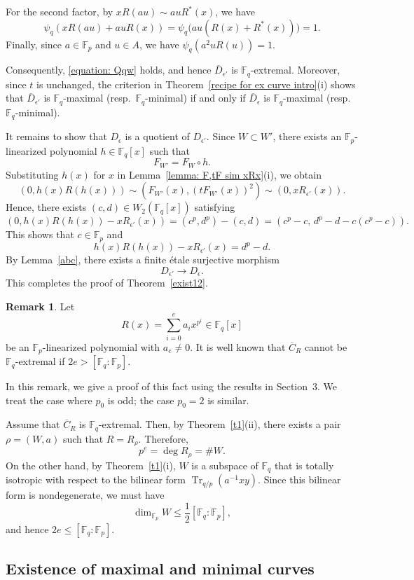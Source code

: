 \documentclass[12pt,a4paper]{amsart}
\theoremstyle{definition}
\newtheorem{remark}[theorem]{Remark}
\def\F{{\mathbb F}}
\theoremstyle{remark}
\DeclareMathOperator{\Tr}{Tr}
\begin{document}
For the second factor, by $x R(au) \sim au R^\ast(x)$,  we have
\[
\psi_q(xR(au)+auR(x))
=
\psi_q\bigl(au(R(x)+R^\ast(x))\bigr)
=
1.
\]
Finally, since $a \in \F_p$ and $u\in A$, we have $\psi_q(a^2uR(u))=1$. 


Consequently, \eqref{equation: Qqw} holds, and hence $\overline{D}_{\epsilon'}$ is $\F_q$-extremal. Moreover, since $t$ is unchanged, the criterion in
Theorem~\ref{recipe for ex curve intro}(i) shows that $\overline{D}_{\epsilon'}$ is $\F_q$-maximal
(resp.\ $\F_q$-minimal) if and only if $\overline{D}_{\epsilon}$ is
$\F_q$-maximal (resp.\ $\F_q$-minimal). 

\medskip


It remains to show that $D_{\epsilon}$ is a quotient of $D_{\epsilon'}$.  Since $W\subset W'$, there exists an $\F_p$-linearized polynomial $h\in\F_q[x]$ such that 
\[F_{W'}=F_W\circ h. \]
Substituting $h(x)$ for $x$ in Lemma~\ref{lemma: F,tF sim  xRx}(i), we obtain 
\[
(0,h(x)R(h(x)))\sim \left(F_{W'}(x),(tF_{W'}(x))^2\right)\sim (0,xR_{\epsilon'}(x)). 
\]
Hence, there exists $(c,d)\in W_2(\F_q[x])$ satisfying 
\[
(0,h(x)R(h(x))-xR_{\epsilon'}(x))=(c^p,d^p)-(c,d)=(c^p-c,\, d^p-d-c(c^p-c)). 
\]
This shows that $c\in \F_p$ and 
\[
h(x)R(h(x)) - xR_{\epsilon'}(x)=d^p-d. 
\]
By Lemma~\ref{abc}, 
there exists a finite \'etale surjective morphism 
\[
D_{\epsilon'} \longrightarrow
D_{\epsilon}.
\]
This completes the proof of Theorem~\ref{exist12}.

\begin{remark}\label{remark: e>n does not occur}
Let 
\[
R(x)=\sum_{i=0}^ea_ix^{p^i}\in\F_q[x]
\]
  be an $\F_p$-linearized polynomial with $a_e\neq0$. It is well known that $\overline{C}_R$ cannot be $\F_q$-extremal
if $2e>[\F_q:\F_p]$. 

In this remark, we give a proof of this fact using the results in Section~3. We treat the case where $p_0$ is odd; the case $p_0=2$ is similar. 

Assume that $\overline{C}_R$ is $\F_q$-extremal. Then, by Theorem~\ref{t1}(ii), there exists a pair $\rho=(W,a)$ such that $R=R_\rho$. Therefore,
\[
p^e=\deg R_\rho=\#W.
\]
On the other hand, by Theorem~\ref{t1}(i), $W$ is a subspace of $\F_q$ that is totally isotropic with respect to the bilinear form $\Tr_{q/p}(a^{-1}xy)$. Since this bilinear form is nondegenerate, we must have 
\[
\dim_{\F_p}W\le \frac{1}{2}[\F_q:\F_p],\]
and hence $2e\le [\F_q:\F_p]$. 
\end{remark}


\subsection{Existence of maximal and minimal curves}
\end{document}

